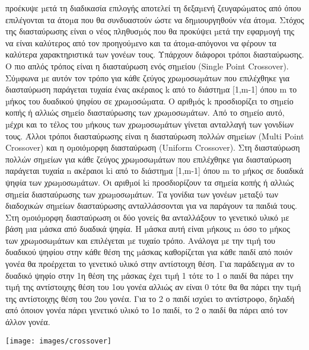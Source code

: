 προέκυψε µετά τη διαδικασία επιλογής αποτελεί τη δεξαµενή ζευγαρώµατος από όπου επιλέγονται τα άτοµα που θα συνδυαστούν ώστε να δηµιουργηθούν νέα άτοµα. Στόχος της διασταύρωσης είναι ο νέος πληθυσµός που θα προκύψει µετά την εφαρµογή της να είναι καλύτερος από τον προηγούµενο και τα άτοµα-απόγονοι να φέρουν τα καλύτερα χαρακτηριστικά των γονέων τους. Υπάρχουν διάφοροι τρόποι διασταύρωσης. Ο πιο απλός τρόπος είναι η διασταύρωση ενός σηµείου (Single Point Crossover). Σύµφωνα µε αυτόν τον τρόπο για κάθε ζεύγος χρωµοσωµάτων που επιλέχθηκε για διασταύρωση παράγεται τυχαία ένας ακέραιος k από το διάστηµα [1,m-1] όπου m το µήκος του δυαδικού ψηφίου σε χρωµοσώµατα. Ο αριθµός k προσδιορίζει το σηµείο κοπής ή αλλιώς σηµείο διασταύρωσης των χρωµοσωµάτων. Από το σηµείο αυτό, µέχρι και το τέλος του µήκους των χρωµοσωµάτων γίνεται ανταλλαγή των γονιδίων τους. Άλλοι τρόποι διασταύρωσης είναι η διασταύρωση πολλών σηµείων (Multi Point Crossover) και η οµοιόµορφη διασταύρωση (Uniform Crossover). Στη διασταύρωση πολλών σηµείων για κάθε ζεύγος χρωµοσωµάτων που επιλέχθηκε για διασταύρωση παράγεται τυχαία n ακέραιοι ki από το διάστηµα [1,m-1] όπου m το µήκος σε δυαδικά ψηφία των χρωµοσωµάτων. Οι αριθµοί ki προσδιορίζουν τα σηµεία κοπής ή αλλιώς σηµεία διασταύρωσης των χρωµοσωµάτων. Τα γονίδια των γονέων µεταξύ των διαδοχικών σηµείων διασταύρωσης ανταλλάσσονται για να παράγουν τα παιδιά τους. Στη οµοιόµορφη διασταύρωση οι δύο γονείς θα ανταλλάξουν το γενετικό υλικό
µε βάση µια µάσκα από δυαδικά ψηφία. Η µάσκα αυτή είναι µήκους m όσο το µήκος των χρωµοσωµάτων και επιλέγεται µε τυχαίο τρόπο. Ανάλογα µε την τιµή του δυαδικού ψηφίου στην κάθε θέση της µάσκας καθορίζεται για κάθε παιδί από ποιόν γονέα θα προέρχεται το γενετικό υλικό στην αντίστοιχη θέση. Για παράδειγµα αν το δυαδικό ψηφίο στην 1η θέση της µάσκας έχει τιµή 1 τότε το 1 ο παιδί θα πάρει την τιµή της αντίστοιχης θέση του 1ου γονέα αλλιώς αν είναι 0 τότε θα θα πάρει την τιµή της αντίστοιχης θέση του 2ου γονέα. Για το 2 ο παιδί ισχύει το αντίστροφο, δηλαδή από όποιον γονέα πάρει γενετικό υλικό το 1ο παιδί, το 2 ο παιδί θα πάρει από τον
άλλον γονέα.

\noindent\begin{minipage}{\linewidth}
\centering
{}
\texttt{[image: images/crossover]}
\label{fig:Crossover}
\end{minipage}

